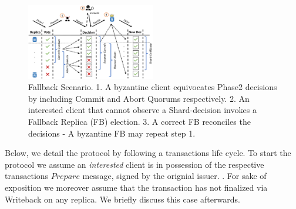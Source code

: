 \begin{figure}
\begin{center}
\includegraphics[width= 0.5\textwidth]{./figures/FBNom.png}
\end{center}
\caption{Fallback Scenario. 1. A byzantine client equivocates Phase2 decisions by including Commit and Abort Quorums respectively. 2. An interested client that cannot observe a Shard-decision invokes a Fallback Replica (FB) election. 3. A correct FB reconciles the decisions - A byzantine FB may repeat step 1.}
\label{fig:FigureFBnom}
\end{figure}



Below, we detail the protocol by following a transactions life cycle. To start the protocol we assume an \textit{interested} client is in possession of the respective transactions $Prepare$ message, signed by the orignial issuer. . For sake of exposition we moreover assume that the transaction has not finalized via Writeback on any replica. We briefly discuss this case afterwards.  




